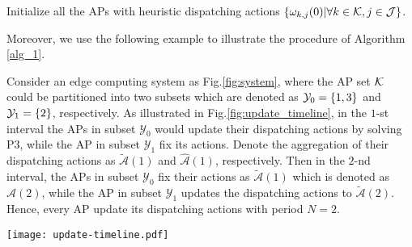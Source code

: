\begin{algorithm}[ht]
    \caption{\algname: Online Alternative Actions Update Algorithm}\label{alg_1}
    \DontPrintSemicolon %
    Initialize all the APs with heuristic dispatching actions $\{{\omega}_{k,j}(0)|\forall k\in\mathcal{K},j\in\mathcal{J}\}$.\;
\end{algorithm}
Moreover, we use the following example to illustrate the procedure of Algorithm \ref{alg_1}.
\begin{example}
    \label{exp:update}
    Consider an edge computing system as Fig.\ref{fig:system}, where the AP set $\mathcal{K}$ could be partitioned into two subsets which are denoted as $\mathcal{Y}_{0} = \{1,3\}$ and $\mathcal{Y}_{1} = \{2\}$, respectively.
    As illustrated in Fig.\ref{fig:update_timeline}, in the $1$-st interval the APs in subset $\mathcal{Y}_{0}$ would update their dispatching actions by solving P3, while the AP in subset $\mathcal{Y}_{1}$ fix its actions.
    Denote the aggregation of their dispatching actions as $\tilde{\mathcal{A}}(1)$ and $\hat{\mathcal{A}}(1)$, respectively.
    Then in the $2$-nd interval, the APs in subset $\mathcal{Y}_{0}$ fix their actions as $\tilde{\mathcal{A}}(1)$ which is denoted as $\hat{\mathcal{A}}(2)$, while 
    the AP in subset $\mathcal{Y}_{1}$ updates the dispatching actions to $\tilde{\mathcal{A}}(2)$.
    Hence, every AP update its dispatching actions with period $N=2$.
    \begin{figure*}[htp!]
        \centering
        \texttt{[image: update-timeline.pdf]}
        \caption{The Illustration of Example \ref{exp:update}.}
        \label{fig:update_timeline}
    \end{figure*}
\end{example}

